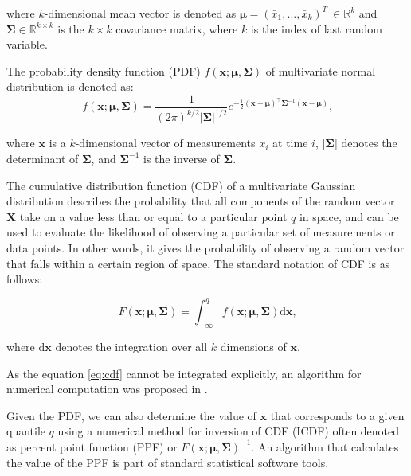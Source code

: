where $k$-dimensional mean vector is denoted as \(\boldsymbol\mu = (\bar x_{1},...,\bar x_{k})^T\ \in \mathbb{R}^{k}\) and \(\boldsymbol\Sigma \in \mathbb{R}^{k\times{k}}\) is the $k \times k$ covariance matrix, where \(k\) is the index of last random variable.

The probability density function (PDF) \(f(\boldsymbol{x}; \boldsymbol{\mu}, \boldsymbol{\Sigma})\) of multivariate normal distribution is denoted as:
\begin{equation}
f(\boldsymbol{x}; \boldsymbol{\mu}, \boldsymbol{\Sigma}) = \frac{1}{(2\pi)^{k/2} |\boldsymbol{\Sigma}|^{1/2}} e^{-\frac{1}{2} (\boldsymbol{x}-\boldsymbol{\mu})^\top \boldsymbol{\Sigma}^{-1} (\boldsymbol{x}-\boldsymbol{\mu})}\text{,}
\end{equation}

where $\boldsymbol{x}$ is a $k$-dimensional vector of measurements $x_i$ at time $i$, $|\boldsymbol{\Sigma}|$ denotes the determinant of $\boldsymbol{\Sigma}$, and $\boldsymbol{\Sigma}^{-1}$ is the inverse of $\boldsymbol{\Sigma}$.

The cumulative distribution function (CDF) of a multivariate Gaussian distribution describes the probability that all components of the random vector \(\boldsymbol{X}\) take on a value less than or equal to a particular point \(q\) in space, and can be used to evaluate the likelihood of observing a particular set of measurements or data points. In other words, it gives the probability of observing a random vector that falls within a certain region of space. The standard notation of CDF is as follows:

\begin{equation}
F(\boldsymbol{x}; \boldsymbol{\mu}, \boldsymbol{\Sigma}) = \int_{-\infty}^{q} f(\boldsymbol{x}; \boldsymbol{\mu}, \boldsymbol{\Sigma}) \text{d}\boldsymbol{x}\text{,}\label{eq:cdf}
\end{equation}

where $\text{d}\boldsymbol{x}$ denotes the integration over all $k$ dimensions of $\boldsymbol{x}$.

As the equation \eqref{eq:cdf} cannot be integrated explicitly, an algorithm for numerical computation was proposed in \citet{Genz2000}.

Given the PDF, we can also determine the value of \(\boldsymbol{x}\) that corresponds to a given quantile $q$ using a numerical method for inversion of CDF (ICDF) often denoted as percent point function (PPF) or $F(\boldsymbol{x}; \boldsymbol{\mu}, \boldsymbol{\Sigma})^{-1}$. An algorithm that calculates the value of the PPF is part of standard statistical software tools.

